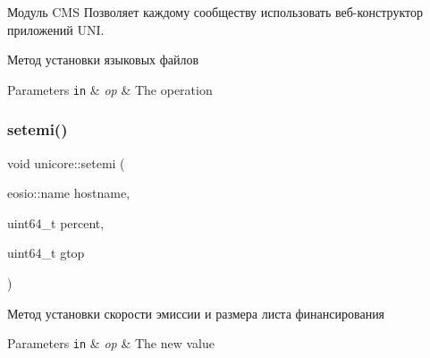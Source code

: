 Модуль C\+MS Позволяет каждому сообществу использовать веб-\/конструктор приложений U\+NI. 

Метод установки языковых файлов


\begin{DoxyParams}[1]{Parameters}
\mbox{\tt in}  & {\em op} & The operation \\
\hline
\end{DoxyParams}
\mbox{\label{classeosio_1_1unicore_affa39993f35c8e2c8838a956c761cbcc}} 
\subsubsection{\texorpdfstring{setemi()}{setemi()}}
{\footnotesize\ttfamily void unicore\+::setemi (\begin{DoxyParamCaption}\item[{eosio\+::name}]{hostname,  }\item[{uint64\+\_\+t}]{percent,  }\item[{uint64\+\_\+t}]{gtop }\end{DoxyParamCaption})}



Метод установки скорости эмиссии и размера листа финансирования 


\begin{DoxyParams}[1]{Parameters}
\mbox{\tt in}  & {\em op} & The new value \\
\hline
\end{DoxyParams}
\mbox{\label{classeosio_1_1unicore_aa2341c3f2393be329d759ef09f20367f}} 
